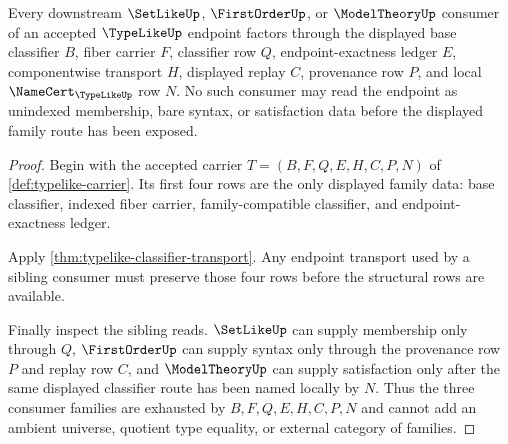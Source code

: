 \begin{theorem}
\label{thm:typelike-displayed-family-consumer-exhaustion}
Every downstream $\SetLikeUp$, $\FirstOrderUp$, or $\ModelTheoryUp$ consumer of an accepted $\TypeLikeUp$ endpoint factors through the displayed base classifier $B$, fiber carrier $F$, classifier row $Q$, endpoint-exactness ledger $E$, componentwise transport $H$, displayed replay $C$, provenance row $P$, and local $\NameCert_{\TypeLikeUp}$ row $N$. No such consumer may read the endpoint as unindexed membership, bare syntax, or satisfaction data before the displayed family route has been exposed.
\end{theorem}
\begin{proof}
Begin with the accepted carrier $T=(B,F,Q,E,H,C,P,N)$ of \autoref{def:typelike-carrier}. Its first four rows are the only displayed family data: base classifier, indexed fiber carrier, family-compatible classifier, and endpoint-exactness ledger.

Apply \autoref{thm:typelike-classifier-transport}. Any endpoint transport used by a sibling consumer must preserve those four rows before the structural rows are available.

Finally inspect the sibling reads. $\SetLikeUp$ can supply membership only through $Q$, $\FirstOrderUp$ can supply syntax only through the provenance row $P$ and replay row $C$, and $\ModelTheoryUp$ can supply satisfaction only after the same displayed classifier route has been named locally by $N$. Thus the three consumer families are exhausted by $B,F,Q,E,H,C,P,N$ and cannot add an ambient universe, quotient type equality, or external category of families.
\end{proof}

